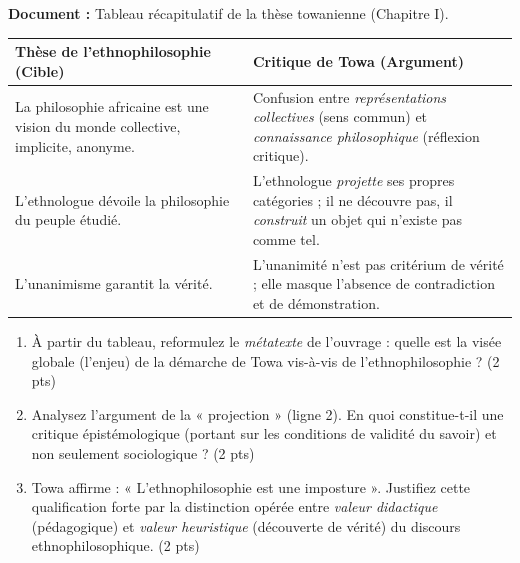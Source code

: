 \documentclass[11pt]{article}
\begin{document}
\begin{exercice}
\textbf{Document :} Tableau récapitulatif de la thèse towanienne (Chapitre I).\\
\begin{tabularx}{\linewidth}{>{\raggedright\arraybackslash}X>{\raggedright\arraybackslash}X}
\hline
\textbf{Thèse de l'ethnophilosophie (Cible)} & \textbf{Critique de Towa (Argument)} \\
\hline
La philosophie africaine est une vision du monde collective, implicite, anonyme. & Confusion entre \textit{représentations collectives} (sens commun) et \textit{connaissance philosophique} (réflexion critique). \\
\hline
L'ethnologue dévoile la philosophie du peuple étudié. & L'ethnologue \textit{projette} ses propres catégories ; il ne découvre pas, il \textit{construit} un objet qui n'existe pas comme tel. \\
\hline
L'unanimisme garantit la vérité. & L'unanimité n'est pas critérium de vérité ; elle masque l'absence de contradiction et de démonstration. \\
\hline
\end{tabularx}
\begin{enumerate}
    \item À partir du tableau, reformulez le \textit{métatexte} de l'ouvrage : quelle est la visée globale (l'enjeu) de la démarche de Towa vis-à-vis de l'ethnophilosophie ? (2 pts)
    \item Analysez l'argument de la « projection » (ligne 2). En quoi constitue-t-il une critique épistémologique (portant sur les conditions de validité du savoir) et non seulement sociologique ? (2 pts)
    \item Towa affirme : « L'ethnophilosophie est une imposture ». Justifiez cette qualification forte par la distinction opérée entre \textit{valeur didactique} (pédagogique) et \textit{valeur heuristique} (découverte de vérité) du discours ethnophilosophique. (2 pts)
\end{enumerate}
\end{exercice}
\end{document}
